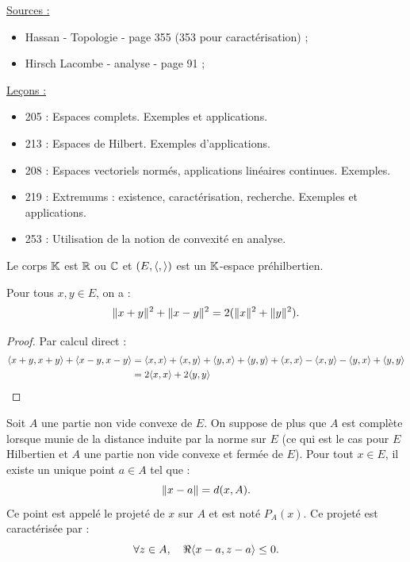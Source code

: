 
\newcommand{\Ee}{E^{\ast}}

\pagestyle{fancy}

\fancyhead[R]{}



\underline{Sources :} 
\begin{itemize}
\item Hassan - Topologie - page 355 (353 pour caractérisation) ;
\item Hirsch Lacombe - analyse - page 91 ;
\end{itemize}

\underline{Leçons :}
\begin{itemize}
\item  205 : Espaces complets. Exemples et applications.
\item  213 : Espaces de Hilbert. Exemples d’applications.
\item  208 : Espaces vectoriels normés, applications linéaires continues. Exemples.
\item  219 : Extremums : existence, caractérisation, recherche. Exemples et applications.
\item  253 : Utilisation de la notion de convexité en analyse.
\end{itemize}

\begin{nota}
Le corps $\mathbb{K}$ est $\mathbb{R}$ ou $\mathbb{C}$ et $(E, \langle,\rangle)$ est un $\mathbb{K}$-espace préhilbertien.
\end{nota}

\begin{lem}
Pour tous $x, y \in E$, on a :
\[ \lVert x+y\rVert^2 + \lVert x-y\rVert^2 = 2( \lVert x\rVert^2 + \lVert y\rVert^2) . \]
\end{lem}

\begin{proof}
Par calcul direct :
\begin{align*}
\langle x+y,x+y\rangle + \langle x-y,x-y\rangle & = \langle x,x\rangle + \langle x,y\rangle + \langle y,x\rangle + \langle y,y\rangle + \langle x,x\rangle - \langle x,y\rangle - \langle y,x\rangle + \langle y,y\rangle \\
& = 2\langle x,x\rangle + 2\langle y,y\rangle 
\end{align*}
\end{proof}

\begin{thm}
Soit $A$ une partie non vide convexe de $E$. 
On suppose de plus que $A$ est complète lorsque munie de la distance induite par la norme sur $E$ (ce qui est le cas pour $E$ Hilbertien
et $A$ une partie non vide convexe et fermée de $E$).
Pour tout $x \in E$, il existe un unique point $a \in A$ tel que :
\[ \lVert x-a\rVert = d(x,A) . \]
Ce point est appelé le projeté de $x$ sur $A$ et est noté $P_A(x)$.
Ce projeté est caractérisée par :
\begin{equation}
\forall z \in A, \quad \Re{\langle x-a,z-a\rangle} \leq 0 . \label{eq:1}
\end{equation}
\end{thm}

